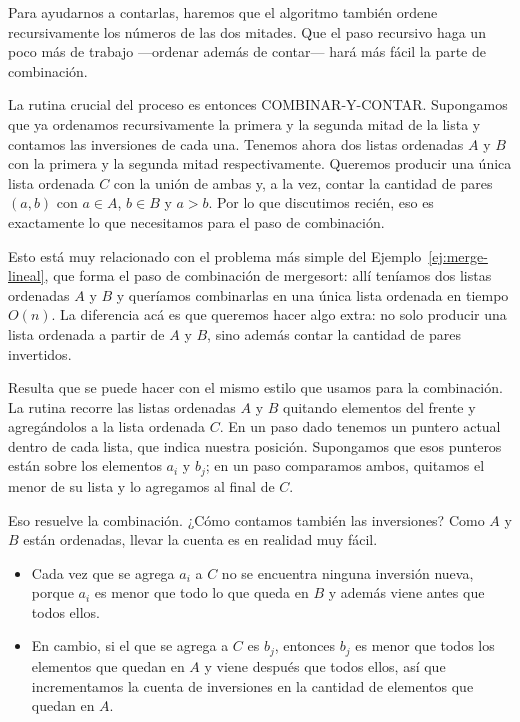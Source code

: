 \documentclass[12pt, spanish, oneside, openany]{book}
\newcommand{\alg}[1]{#1}
\theoremstyle{uprightplain}
\theoremstyle{definition}
\theoremstyle{remark}
\theoremstyle{definition}
\begin{document}
Para ayudarnos a contarlas, haremos que el algoritmo también ordene recursivamente los números de las dos mitades. Que el paso recursivo haga un poco más de trabajo ---ordenar además de contar--- hará más fácil la parte de combinación.

La rutina crucial del proceso es entonces \alg{COMBINAR-Y-CONTAR}. Supongamos que ya ordenamos recursivamente la primera y la segunda mitad de la lista y contamos las inversiones de cada una. Tenemos ahora dos listas ordenadas $A$ y $B$ con la primera y la segunda mitad respectivamente. Queremos producir una única lista ordenada $C$ con la unión de ambas y, a la vez, contar la cantidad de pares $(a,b)$ con $a\in A$, $b\in B$ y $a>b$. Por lo que discutimos recién, eso es exactamente lo que necesitamos para el paso de combinación.

Esto está muy relacionado con el problema más simple del Ejemplo~\ref{ej:merge-lineal}, que forma el paso de combinación de mergesort: allí teníamos dos listas ordenadas $A$ y $B$ y queríamos combinarlas en una única lista ordenada en tiempo $O(n)$. La diferencia acá es que queremos hacer algo extra: no solo producir una lista ordenada a partir de $A$ y $B$, sino además contar la cantidad de pares invertidos.

Resulta que se puede hacer con el mismo estilo que usamos para la combinación. La rutina recorre las listas ordenadas $A$ y $B$ quitando elementos del frente y agregándolos a la lista ordenada $C$. En un paso dado tenemos un puntero actual dentro de cada lista, que indica nuestra posición. Supongamos que esos punteros están sobre los elementos $a_i$ y $b_j$; en un paso comparamos ambos, quitamos el menor de su lista y lo agregamos al final de $C$.

Eso resuelve la combinación. ¿Cómo contamos también las inversiones? Como $A$ y $B$ están ordenadas, llevar la cuenta es en realidad muy fácil.

\begin{itemize}
    \item Cada vez que se agrega $a_i$ a $C$ no se encuentra ninguna inversión nueva, porque $a_i$ es menor que todo lo que queda en $B$ y además viene antes que todos ellos.
    \item En cambio, si el que se agrega a $C$ es $b_j$, entonces $b_j$ es menor que todos los elementos que quedan en $A$ y viene después que todos ellos, así que incrementamos la cuenta de inversiones en la cantidad de elementos que quedan en $A$.
\end{itemize}
\end{document}
